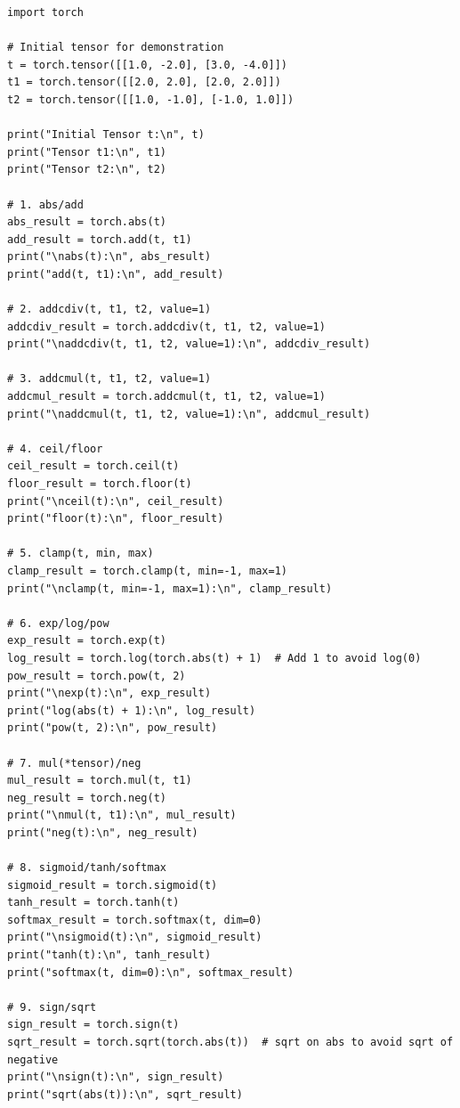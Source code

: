 \begin{lstlisting}[style=pythonstyle]
import torch

# Initial tensor for demonstration
t = torch.tensor([[1.0, -2.0], [3.0, -4.0]])
t1 = torch.tensor([[2.0, 2.0], [2.0, 2.0]])
t2 = torch.tensor([[1.0, -1.0], [-1.0, 1.0]])

print("Initial Tensor t:\n", t)
print("Tensor t1:\n", t1)
print("Tensor t2:\n", t2)

# 1. abs/add
abs_result = torch.abs(t)
add_result = torch.add(t, t1)
print("\nabs(t):\n", abs_result)
print("add(t, t1):\n", add_result)

# 2. addcdiv(t, t1, t2, value=1)
addcdiv_result = torch.addcdiv(t, t1, t2, value=1)
print("\naddcdiv(t, t1, t2, value=1):\n", addcdiv_result)

# 3. addcmul(t, t1, t2, value=1)
addcmul_result = torch.addcmul(t, t1, t2, value=1)
print("\naddcmul(t, t1, t2, value=1):\n", addcmul_result)

# 4. ceil/floor
ceil_result = torch.ceil(t)
floor_result = torch.floor(t)
print("\nceil(t):\n", ceil_result)
print("floor(t):\n", floor_result)

# 5. clamp(t, min, max)
clamp_result = torch.clamp(t, min=-1, max=1)
print("\nclamp(t, min=-1, max=1):\n", clamp_result)

# 6. exp/log/pow
exp_result = torch.exp(t)
log_result = torch.log(torch.abs(t) + 1)  # Add 1 to avoid log(0)
pow_result = torch.pow(t, 2)
print("\nexp(t):\n", exp_result)
print("log(abs(t) + 1):\n", log_result)
print("pow(t, 2):\n", pow_result)

# 7. mul(*tensor)/neg
mul_result = torch.mul(t, t1)
neg_result = torch.neg(t)
print("\nmul(t, t1):\n", mul_result)
print("neg(t):\n", neg_result)

# 8. sigmoid/tanh/softmax
sigmoid_result = torch.sigmoid(t)
tanh_result = torch.tanh(t)
softmax_result = torch.softmax(t, dim=0)
print("\nsigmoid(t):\n", sigmoid_result)
print("tanh(t):\n", tanh_result)
print("softmax(t, dim=0):\n", softmax_result)

# 9. sign/sqrt
sign_result = torch.sign(t)
sqrt_result = torch.sqrt(torch.abs(t))  # sqrt on abs to avoid sqrt of negative
print("\nsign(t):\n", sign_result)
print("sqrt(abs(t)):\n", sqrt_result)
\end{lstlisting}
